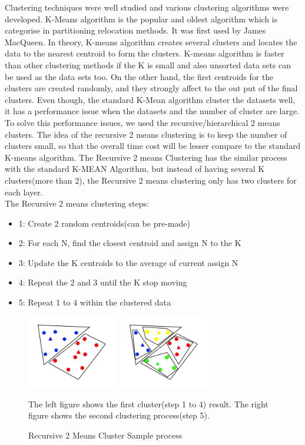 \documentclass[runningheads,a4paper]{llncs}
\newcommand{\naoki}{\todo[author=NK,color=yellow,inline]}
\begin{document}
Clustering techniques were well studied and various clustering algorithms were developed. K-Means algorithm is the popular and oldest algorithm which is categorise in partitioning relocation methods. It was first used by James MacQueen. %
In theory, K-means algorithm creates several clusters and locates the data to the nearest centroid to form the clusters.
K-means algorithm is faster than other clustering methods if the K is small and also unsorted data sets can be used as the data sets too. On the other hand, the first centroids for the clusters are created randomly, and they strongly affect to the out put of the final clusters.
Even though, the standard K-Mean algorithm cluster the datasets well, it has a performance issue when the datasets and the number of cluster are large. To solve this performance issues, we used the recursive/hierarchical 2 means clusters. The idea of the recursive 2 means clustering is to keep the number of clusters small, so that the overall time cost will be lesser compare to the standard K-means algorithm.
\naoki{edit end}
The Recursive 2 means Clustering has the similar process with the standard K-MEAN Algorithm, but instead of having several K clusters(more than 2), the Recursive 2 means clustering only has two clusters for each layer\footnotemark.\\
The Recursive 2 means clustering steps:

\begin{itemize}
\item 1: Create 2 random centroids(can be pre-made)
\item 2: For each N, find the closest centroid and assign N to the K
\item 3: Update the K centroids to the average of current assign N
\item 4: Repeat the 2 and 3 until the K stop moving
\item 5: Repeat 1 to 4 within the clustered data
\end{itemize}


\begin{figure}[h]
	\centering
	\includegraphics[width=4cm,bb=0 0 377 300]{Sample2mean1.jpg}
	\includegraphics[width=4cm,bb=0 0 377 300]{Sample2mean2.jpg}	
	\caption{Recursive 2 Means Cluster Sample process}\label{fig:2MEANS}
	{\footnotesize The left figure shows the first cluster(step 1 to 4) result. The right figure shows the second clustering process(step 5). }
\end{figure}
\end{document}
